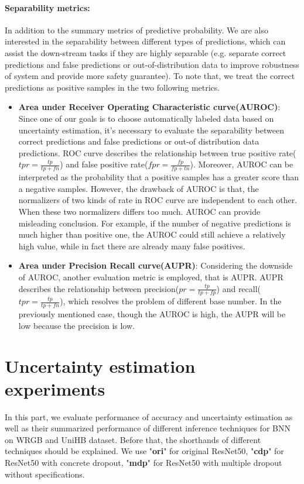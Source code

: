 \paragraph{Separability metrics:} In addition to the summary metrics of predictive probability. We are also interested in the separability between different types of predictions, which can assist the down-stream tasks if they are highly separable (e.g. separate correct predictions and false predictions or out-of-distribution data to improve robustness of system and provide more safety guarantee). To note that, we treat the correct predictions as positive samples in the two following metrics.
\begin{itemize}
	\item \textbf{Area under Receiver Operating Characteristic curve(AUROC)}: Since one of our goals is to choose automatically labeled data based on uncertainty estimation, it's necessary to evaluate the separability between correct predictions and false predictions or out-of distribution data predictions. ROC curve describes the relationship between true positive rate($tpr=\frac{tp}{tp+fn}$) and false positive rate($fpr=\frac{fp}{fp+tn}$). Moreover, AUROC can be interpreted as the probability that a positive samples has a greater score than a negative samples. However, the drawback of AUROC is that, the normalizers of two kinds of rate in ROC curve are independent to each other. When these two normalizers differs too much. AUROC can provide misleading conclusion. For example, if the number of negative predictions is much higher than positive one, the AUROC could still achieve a relatively high value, while in fact there are already many false positives. 
	
	\item \textbf{Area under Precision Recall curve(AUPR)}: Considering the downside of AUROC, another evaluation metric is employed, that is AUPR. AUPR describes the relationship between precision($pr = \frac{tp}{tp+fp}$) and recall($tpr=\frac{tp}{tp+fn}$), which resolves the problem of different base number. In the previously mentioned case, though the AUROC is high, the AUPR will be low because the precision is low. 
\end{itemize}


\section{Uncertainty estimation experiments}
In this part, we evaluate performance of accuracy and uncertainty estimation as well as their summarized performance of different inference techniques for BNN on WRGB and UniHB dataset. Before that, the shorthands of different techniques should be explained. We use "\textbf{ori}" for original ResNet50, "\textbf{cdp}" for ResNet50 with concrete dropout, "\textbf{mdp}" for ResNet50 with multiple dropout without specifications.

